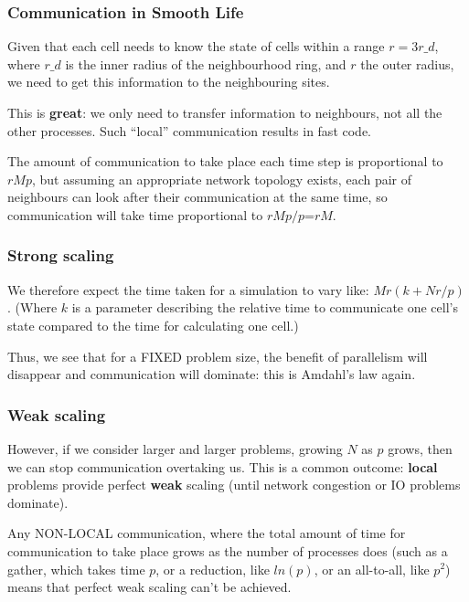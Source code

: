 \subsubsection{Communication in Smooth
Life}\label{communication-in-smooth-life}

Given that each cell needs to know the state of cells within a range
$r=3r\_d$, where $r\_d$ is the inner radius of the neighbourhood ring,
and $r$ the outer radius, we need to get this information to the
neighbouring sites.

This is \textbf{great}: we only need to transfer information to
neighbours, not all the other processes. Such ``local'' communication
results in fast code.

The amount of communication to take place each time step is proportional
to $rMp$, but assuming an appropriate network topology exists, each pair
of neighbours can look after their communication at the same time, so
communication will take time proportional to $rMp/p$=$rM$.

\subsubsection{Strong scaling}\label{strong-scaling}

We therefore expect the time taken for a simulation to vary like:
$Mr(k+Nr/p)$. (Where $k$ is a parameter describing the relative time to
communicate one cell's state compared to the time for calculating one
cell.)

Thus, we see that for a FIXED problem size, the benefit of parallelism
will disappear and communication will dominate: this is Amdahl's law
again.

\subsubsection{Weak scaling}\label{weak-scaling}

However, if we consider larger and larger problems, growing $N$ as $p$
grows, then we can stop communication overtaking us. This is a common
outcome: \textbf{local} problems provide perfect \textbf{weak} scaling
(until network congestion or IO problems dominate).

Any NON-LOCAL communication, where the total amount of time for
communication to take place grows as the number of processes does (such
as a gather, which takes time $p$, or a reduction, like $ln(p)$, or an
all-to-all, like $p^2$) means that perfect weak scaling can't be
achieved.

